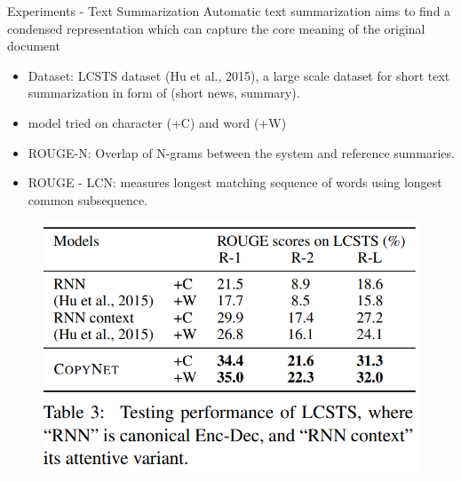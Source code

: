 \documentclass{beamer}
\begin{document}
\begin{frame}{Experiments - Text Summarization}
    Automatic text summarization aims to find a condensed representation which can capture the core meaning of the original document
    \begin{itemize}
        \item Dataset:  LCSTS dataset (Hu et al., 2015), a large scale dataset for short text summarization in form of (short news, summary).
        \item model tried on character (+C) and word (+W)
        \item ROUGE-N: Overlap of N-grams between the system and reference summaries.
        \item ROUGE - LCN: measures longest matching sequence of words using longest common subsequence.
    \end{itemize}
    \begin{figure}
        \centering
        \includegraphics[scale=0.7]{sum_result.PNG}
    \end{figure}
\end{frame}
\end{document}
